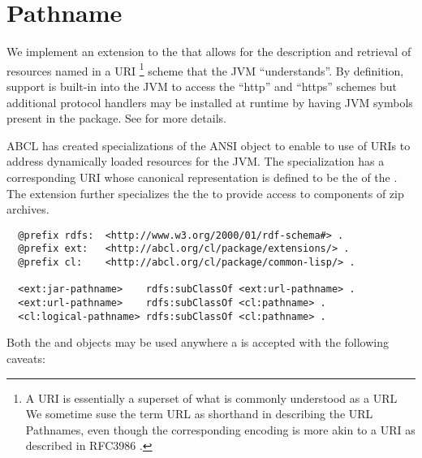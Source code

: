 \documentclass[10pt]{book}
\begin{document}
\section{Pathname}

We implement an extension to the  that allows for
the description and retrieval of resources named in a
\textsc{URI} \footnote{A \textsc{URI} is essentially a superset of
  what is commonly understood as a \textsc{URL} We sometime suse the
  term URL as shorthand in describing the URL Pathnames, even though
  the corresponding encoding is more akin to a URI as described in
  RFC3986 \cite{rfc3986}.}  scheme that the \textsc{JVM}
``understands''.  By definition, support is built-in into the JVM to
access the ``http'' and ``https'' schemes but additional protocol
handlers may be installed at runtime by having \textsc{JVM} symbols
present in the  package. See
\cite{maso2000} for more details.

\textsc{ABCL} has created specializations of the ANSI
 object to enable to use of \textsc{URI}s to address
dynamically loaded resources for the JVM.  The 
specialization has a corresponding \textsc{URI} whose canonical
representation is defined to be the  of the
. The  extension further
specializes the the  to provide access to
components of zip archives.  

\begin{verbatim}
  @prefix rdfs:  <http://www.w3.org/2000/01/rdf-schema#> .
  @prefix ext:   <http://abcl.org/cl/package/extensions/> .
  @prefix cl:    <http://abcl.org/cl/package/common-lisp/> .
  
  <ext:jar-pathname>    rdfs:subClassOf <ext:url-pathname> .
  <ext:url-pathname>    rdfs:subClassOf <cl:pathname> .
  <cl:logical-pathname> rdfs:subClassOf <cl:pathname> .
\end{verbatim}

\label{EXTENSIONS:URL-PATHNAME}

\label{EXTENSIONS:JAR-PATHNAME}

Both the  and  objects
may be used anywhere a  is accepted with the
following caveats:
\end{document}
